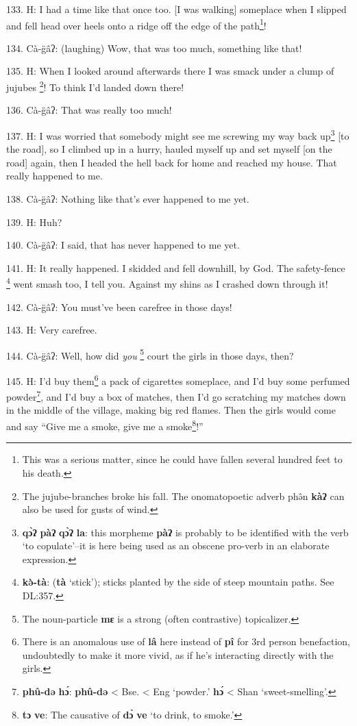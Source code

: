 133. H: I had a time like that once too. [I was walking] someplace when I slipped
and fell head over heels onto a ridge off the edge of the path\footnote{This was a serious matter, since he could have fallen several hundred feet to his death.}!

134. Cà-g̈âʔ: (laughing) Wow, that was too much, something like that!

135. H: When I looked around afterwards there I was smack under a clump of jujubes
\footnote{The jujube-branches broke his fall. The onomatopoetic adverb phə̂n \textbf{kàʔ} can also be used for gusts of wind.}! To think I'd landed down there!

136. Cà-g̈âʔ: That was really too much!

137. H: I was worried that somebody might see me screwing my way back up\footnote{\textbf{qɔ̀ʔ} \textbf{pàʔ} \textbf{qɔ̀ʔ} \textbf{la}: this morpheme \textbf{pàʔ} is probably to be identified with the verb `to copulate'--it is here being used as an obscene pro-verb in an elaborate expression.} [to
the road], so I climbed up in a hurry, hauled myself up and set myself [on the
road] again, then I headed the hell back for home and reached my house. That really
happened to me.

138. Cà-g̈âʔ: Nothing like that's ever happened to me yet.

139. H: Huh?

140. Cà-g̈âʔ: I said, that has never happened to me yet.

141. H: It really happened. I skidded and fell downhill, by God. The safety-fence
\footnote{\textbf{kə̀-tà}: (\textbf{tà} `stick'); sticks planted by the side of steep mountain paths. See DL:357.} went smash too, I tell you. Against my shins as I crashed down through it!

142. Cà-g̈âʔ: You must've been carefree in those days!

143. H: Very carefree.

144. Cà-g̈âʔ: Well, how did \textit{you }\footnote{The noun-particle \textbf{mɛ} is a strong (often contrastive) topicalizer.} court the girls in those days,
then?

145. H: I'd buy them\footnote{There is an anomalous use of \textbf{lâ} here instead of \textbf{pî} for 3rd person benefaction, undoubtedly to make it more vivid, as if he's interacting directly with the girls.} a pack of cigarettes someplace, and I'd buy some perfumed
powder\footnote{\textbf{phû-də} \textbf{hɔ́}: \textbf{phû-də} < Bse. < Eng `powder.' \textbf{hɔ́} < Shan `sweet-smelling'.}, and I'd buy a box of matches, then I'd go scratching my matches down
in the middle of the village, making big red flames. Then the girls would come
and say ``Give me a smoke, give me a smoke\footnote{\textbf{tɔ} \textbf{ve}: The causative of \textbf{dɔ̀} \textbf{ve} `to drink, to smoke.'}!''

